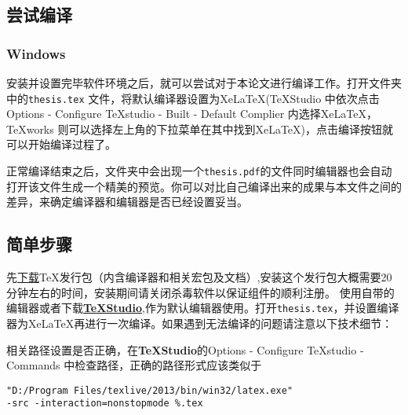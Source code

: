 \subsection{尝试编译}
\subsubsection{Windows}
安装并设置完毕软件环境之后，就可以尝试对于本论文进行编译工作。打开文件夹中的\verb|thesis.tex| 文件，将默认编译器设置为Xe\LaTeX(\TeX Studio 中依次点击Options - Configure TeXstudio - Built - Default Complier 内选择Xe\LaTeX ，\TeX works 则可以选择左上角的下拉菜单在其中找到Xe\LaTeX )，点击编译按钮就可以开始编译过程了。

正常编译结束之后，文件夹中会出现一个\verb|thesis.pdf|的文件同时编辑器也会自动打开该文件生成一个精美的预览。你可以对比自己编译出来的成果与本文件之间的差异，来确定编译器和编辑器是否已经设置妥当。

\subsection{简单步骤}
先\href{https://www.tug.org/texlive/acquire-iso.html}{下载}\TeX 发行包（内含编译器和相关宏包及文档）,安装这个发行包大概需要20分钟左右的时间，安装期间请关闭杀毒软件以保证组件的顺利注册。
使用自带的编辑器或者下载\href{http://texstudio.sourceforge.net/}{\textbf{\TeX Studio}},作为默认编辑器使用。打开\verb|thesis.tex|，并设置编译器为Xe\LaTeX 再进行一次编译。如果遇到无法编译的问题请注意以下技术细节：

相关路径设置是否正确，在\textbf{\TeX Studio}的Options - Configure TeXstudio - Commands 中检查路径，正确的路径形式应该类似于

\begin{verbatim}
"D:/Program Files/texlive/2013/bin/win32/latex.exe"
-src -interaction=nonstopmode %.tex
\end{verbatim}



















